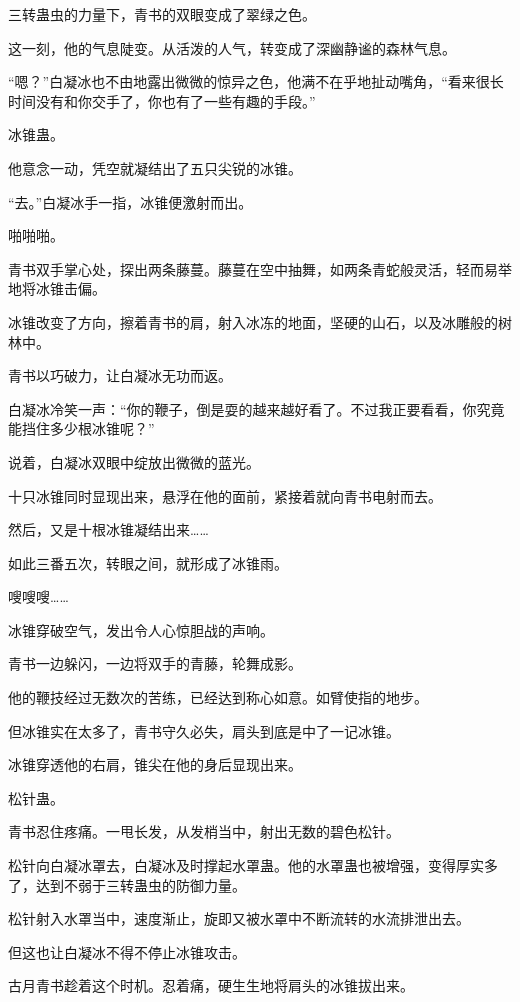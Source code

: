 
\begin{this_body}

三转蛊虫的力量下，青书的双眼变成了翠绿之色。

这一刻，他的气息陡变。从活泼的人气，转变成了深幽静谧的森林气息。

“嗯？”白凝冰也不由地露出微微的惊异之色，他满不在乎地扯动嘴角，“看来很长时间没有和你交手了，你也有了一些有趣的手段。”

冰锥蛊。

他意念一动，凭空就凝结出了五只尖锐的冰锥。

“去。”白凝冰手一指，冰锥便激射而出。

啪啪啪。

青书双手掌心处，探出两条藤蔓。藤蔓在空中抽舞，如两条青蛇般灵活，轻而易举地将冰锥击偏。

冰锥改变了方向，擦着青书的肩，射入冰冻的地面，坚硬的山石，以及冰雕般的树林中。

青书以巧破力，让白凝冰无功而返。

白凝冰冷笑一声：“你的鞭子，倒是耍的越来越好看了。不过我正要看看，你究竟能挡住多少根冰锥呢？”

说着，白凝冰双眼中绽放出微微的蓝光。

十只冰锥同时显现出来，悬浮在他的面前，紧接着就向青书电射而去。

然后，又是十根冰锥凝结出来……

如此三番五次，转眼之间，就形成了冰锥雨。

嗖嗖嗖……

冰锥穿破空气，发出令人心惊胆战的声响。

青书一边躲闪，一边将双手的青藤，轮舞成影。

他的鞭技经过无数次的苦练，已经达到称心如意。如臂使指的地步。

但冰锥实在太多了，青书守久必失，肩头到底是中了一记冰锥。

冰锥穿透他的右肩，锥尖在他的身后显现出来。

松针蛊。

青书忍住疼痛。一甩长发，从发梢当中，射出无数的碧色松针。

松针向白凝冰罩去，白凝冰及时撑起水罩蛊。他的水罩蛊也被增强，变得厚实多了，达到不弱于三转蛊虫的防御力量。

松针射入水罩当中，速度渐止，旋即又被水罩中不断流转的水流排泄出去。

但这也让白凝冰不得不停止冰锥攻击。

古月青书趁着这个时机。忍着痛，硬生生地将肩头的冰锥拔出来。


\end{this_body}
